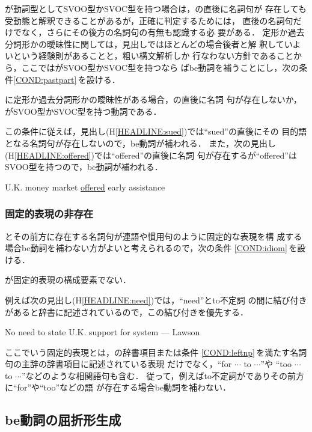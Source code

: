 \KEYC が動詞型としてSVOO型かSVOC型を持つ場合は，\KEYC の直後に名詞句が
存在しても受動態と解釈できることがあるが，正確に判定するためには，
\KEYC 直後の名詞句だけでなく，さらにその後方の名詞句の有無も認識する必
要がある．
定形か過去分詞形かの曖昧性に関しては，見出しではほとんどの場合後者と解
釈していよいという経験則\cite{Uenoda78}があることと，粗い構文解析しか
行なわない方針であることから，ここでは\KEYC がSVOO型かSVOC型を持つなら
ばbe動詞を補うことにし，次の条件\ref{COND:pastpart}\,を設ける．
\begin{COND}
\cond \KEYC に定形か過去分詞形かの曖昧性がある場合，\KEYC の直後に名詞
句が存在しないか，\KEYC がSVOO型かSVOC型を持つ動詞である．
\label{COND:pastpart}
\end{COND}
この条件に従えば，見出し(H\ref{HEADLINE:sued})では``sued''の直後にその
目的語となる名詞句が存在しないので，be動詞が補われる．
また，次の見出し(H\ref{HEADLINE:offered})では``offered''の直後に名詞
句が存在するが``offered''はSVOO型を持つので，be動詞が補われる．
\begin{HEADLINE}
\headline U.K. money market \underline{offered} early assistance
\label{HEADLINE:offered}
\end{HEADLINE}

\subsubsection{固定的表現の非存在}

\KEYC とその前方に存在する名詞句が連語や慣用句のように固定的な表現を構
成する場合be動詞を補わない方がよいと考えられるので，次の条件
\ref{COND:idiom}\,を設ける．
\begin{COND}
\cond \KEYC が固定的表現の構成要素でない．
\label{COND:idiom}
\end{COND}
例えば次の見出し(H\ref{HEADLINE:need})では，``need''とto不定詞
の間に結び付きがあると辞書に記述されているので，この結び付きを優先する．
\begin{HEADLINE}
\headline No need to state U.K. support for system --- Lawson
\label{HEADLINE:need}
\end{HEADLINE}

ここでいう固定的表現とは，\KEYC の辞書項目または条件
\ref{COND:leftnp}\,を満たす名詞句の主辞の辞書項目に記述されている表現
だけでなく，``for $\cdots$ to $\cdots$''や
``too $\cdots$ to $\cdots$''などのような相関語句も含む．
従って，例えばto不定詞が\KEYC でありその前方に``for''や``too''などの語
が存在する場合be動詞を補わない．

\subsection{be動詞の屈折形生成}
\label{sec:preeditHeadline:inflex}

